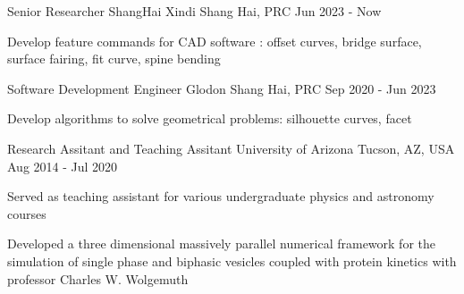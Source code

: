 
  \cventry
    {Senior Researcher} %
    {ShangHai Xindi} %
    {Shang Hai, PRC} %
    {Jun 2023 - Now} %
    {
      \begin{cvitems} %
         \item {Develop feature commands for CAD software : offset curves, bridge surface, surface fairing, fit curve, spine bending}    
      \end{cvitems}
    }  
  
  \cventry
    {Software Development Engineer} %
    {Glodon} %
    {Shang Hai, PRC} %
    {Sep 2020 - Jun 2023} %
    {
      \begin{cvitems} %
         \item {Develop algorithms to solve geometrical problems: silhouette curves, facet}    
      \end{cvitems}
    }
    
  \cventry
    {Research Assitant and Teaching Assitant} %
    {University of Arizona} %
    {Tucson, AZ, USA} %
    {Aug 2014 - Jul 2020} %
    {
      \begin{cvitems} %
         \item {Served as teaching assistant for various undergraduate physics and astronomy courses}
         \item {Developed a three dimensional massively parallel numerical framework for the simulation of single phase and biphasic vesicles coupled with protein kinetics with professor Charles W. Wolgemuth}
      \end{cvitems}
    }
  
